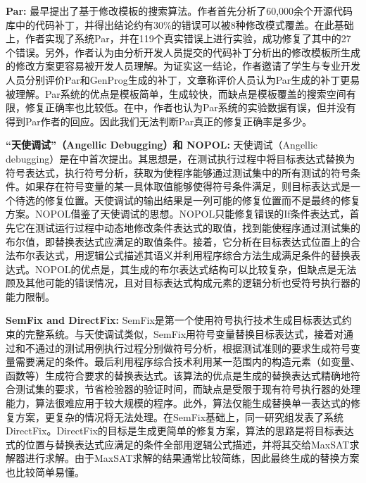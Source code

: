\textbf{Par:}
\cite{kim2013automatic}最早提出了基于修改模板的搜索算法。作者首先分析了60,000余个开源代码库中的代码补丁，并得出结论约有30\%的错误可以被8种修改模式覆盖。在此基础上，作者实现了系统Par，并在119个真实错误上进行实验，成功修复了其中的27个错误。另外，作者认为由分析开发人员提交的代码补丁分析出的修改模板所生成的修改方案更容易被开发人员理解。为证实这一结论，作者邀请了学生与专业开发人员分别评价Par和GenProg生成的补丁，文章称评价人员认为Par生成的补丁更易被理解。Par系统的优点是模板简单，生成较快，而缺点是模板覆盖的搜索空间有限，修复正确率也比较低。在\cite{qi2015analysis}中，作者也认为Par系统的实验数据有误，但并没有得到Par作者的回应。因此我们无法判断Par真正的修复正确率是多少。


\textbf{“天使调试”（Angellic Debugging）和 NOPOL:}
天使调试（Angellic debugging）是在\cite{chandra2011angelic}中首次提出。其思想是，在测试执行过程中将目标表达式替换为符号表达式，执行符号分析，获取为使程序能够通过测试集中的所有测试的符号条件。如果存在符号变量的某一具体取值能够使得符号条件满足，则目标表达式是一个待选的修复位置。天使调试的输出结果是一列可能的修复位置而不是最终的修复方案。NOPOL\cite{demarco2014automatic}借鉴了天使调试的思想。NOPOL只能修复错误的If条件表达式，首先它在测试运行过程中动态地修改条件表达式的取值，找到能使程序通过测试集的布尔值，即替换表达式应满足的取值条件。接着，它分析在目标表达式位置上的合法布尔表达式，用逻辑公式描述其语义并利用程序综合方法生成满足条件的替换表达式。NOPOL的优点是，其生成的布尔表达式结构可以比较复杂，但缺点是无法顾及其他可能的错误情况，且对目标表达式构成元素的逻辑分析也受符号执行器的能力限制。

\textbf{SemFix and DirectFix:}
SemFix\cite{nguyen2013semfix}是第一个使用符号执行技术生成目标表达式约束的完整系统。与天使调试类似，SemFix用符号变量替换目标表达式，接着对通过和不通过的测试用例执行过程分别做符号分析，根据测试准则的要求生成符号变量需要满足的条件。最后利用程序综合技术利用某一范围内的构造元素（如变量、函数等）生成符合要求的替换表达式。该算法的优点是生成的替换表达式精确地符合测试集的要求，节省检验器的验证时间，而缺点是受限于现有符号执行器的处理能力，算法很难应用于较大规模的程序。此外，算法仅能生成替换单一表达式的修复方案，更复杂的情况将无法处理。在SemFix基础上，同一研究组发表了系统DirectFix\cite{mechtaev2015directfix}。DirectFix的目标是生成更简单的修复方案，算法的思路是将目标表达式的位置与替换表达式应满足的条件全部用逻辑公式描述，并将其交给MaxSAT求解器进行求解。由于MaxSAT求解的结果通常比较简练，因此最终生成的替换方案也比较简单易懂。


